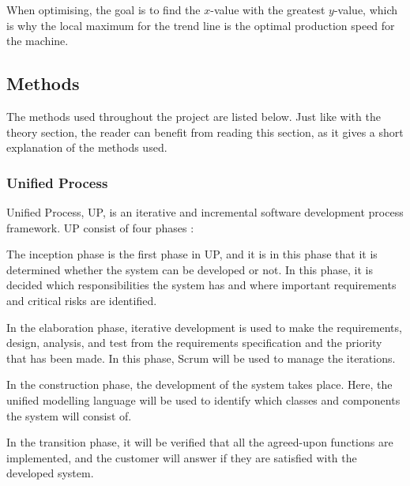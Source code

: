 When optimising, the goal is to find the \(x\)-value with the greatest
\(y\)-value, which is why the local maximum for the trend line is the optimal
production speed for the machine. 


\subsection{Methods}
The methods used throughout the project are listed below. Just like with the
theory section, the reader can benefit from reading this section, as it gives
a short explanation of the methods used.

\subsubsection{Unified Process}
Unified Process, UP, is an iterative and incremental software development
process framework. UP consist of four phases \cite{up}: 

The inception phase is the first phase in UP, and it is in this phase that it
is determined whether the system can be developed or not. In this phase, it is
decided which responsibilities the system has and where important requirements
and critical risks are identified. 

In the elaboration phase, iterative development is used to make the requirements,
design, analysis, and test from the requirements specification and the priority
that has been made. In this phase, Scrum will be used to manage the iterations.

In the construction phase, the development of the system takes place. Here, the 
unified modelling language will be used to identify which classes and components
the system will consist of. 

In the transition phase, it will be verified that all the agreed-upon
functions are implemented, and the customer will answer if they are satisfied
with the developed system.


